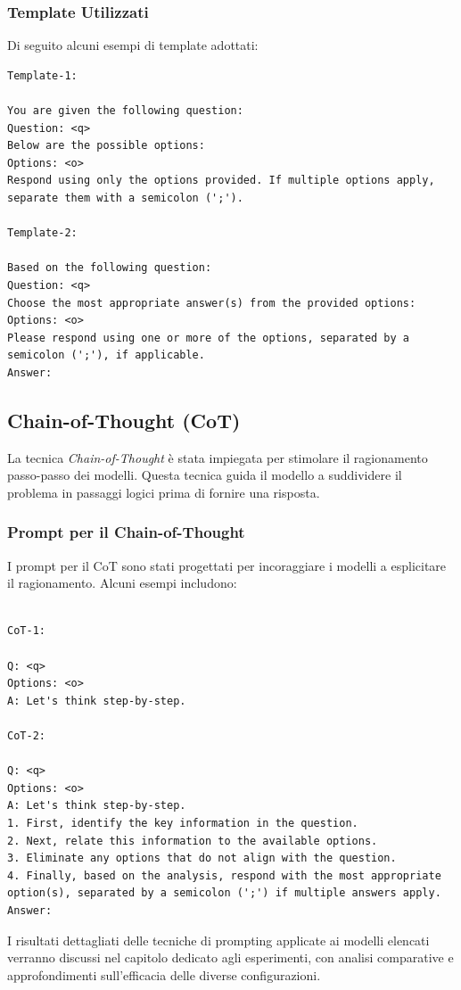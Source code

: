 \documentclass[../main.tex]{subfiles}
\begin{document}
\subsubsection{Template Utilizzati}

Di seguito alcuni esempi di template adottati:
\begin{lstlisting}[breaklines=true]
Template-1:

You are given the following question:
Question: <q>
Below are the possible options:
Options: <o>
Respond using only the options provided. If multiple options apply, separate them with a semicolon (';').

Template-2:

Based on the following question:  
Question: <q>  
Choose the most appropriate answer(s) from the provided options:  
Options: <o>  
Please respond using one or more of the options, separated by a semicolon (';'), if applicable.  
Answer:  

\end{lstlisting}

\subsection{Chain-of-Thought (CoT)}

La tecnica \textit{Chain-of-Thought} è stata impiegata per stimolare il ragionamento passo-passo dei modelli. Questa tecnica guida il modello a suddividere il problema in passaggi logici prima di fornire una risposta.

\subsubsection{Prompt per il Chain-of-Thought}

I prompt per il CoT sono stati progettati per incoraggiare i modelli a esplicitare il ragionamento. Alcuni esempi includono:

\begin{lstlisting}[breaklines=true]

CoT-1:

Q: <q>
Options: <o>
A: Let's think step-by-step.  

CoT-2:

Q: <q>  
Options: <o>  
A: Let's think step-by-step.  
1. First, identify the key information in the question.  
2. Next, relate this information to the available options.  
3. Eliminate any options that do not align with the question.  
4. Finally, based on the analysis, respond with the most appropriate option(s), separated by a semicolon (';') if multiple answers apply.  
Answer: 

\end{lstlisting}

I risultati dettagliati delle tecniche di prompting applicate ai modelli elencati verranno discussi nel capitolo dedicato agli esperimenti, con analisi comparative e approfondimenti sull'efficacia delle diverse configurazioni.
\end{document}
